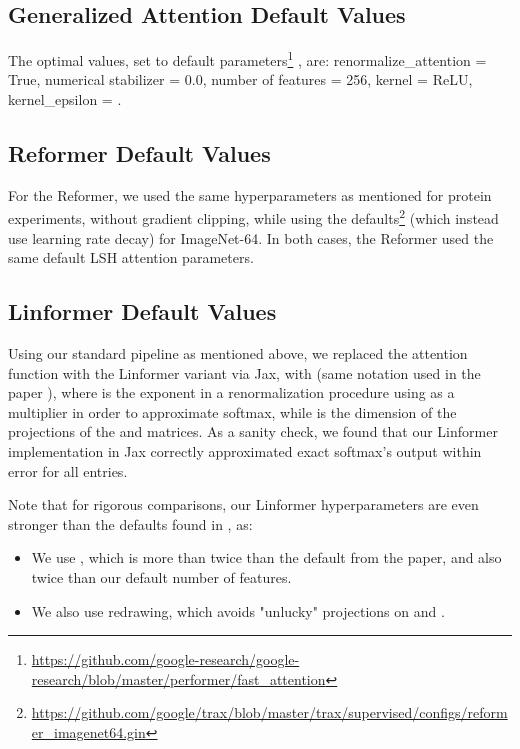 \subsection{Generalized Attention Default Values} \label{subsec:generalized_default} The optimal values, set to default parameters\footnote{\url{https://github.com/google-research/google-research/blob/master/performer/fast_attention}}
, are: renormalize\_attention = True, numerical stabilizer = 0.0, number of features = 256, kernel = ReLU, kernel\_epsilon = . 

\subsection{Reformer Default Values} \label{subsec:reformer_default}
For the Reformer, we used the same hyperparameters as mentioned for protein experiments, without gradient clipping, while using the defaults\footnote{\url{https://github.com/google/trax/blob/master/trax/supervised/configs/reformer_imagenet64.gin}} (which instead use learning rate decay) for ImageNet-64. In both cases, the Reformer used the same default LSH attention parameters.

\subsection{Linformer Default Values} \label{subsec:linformer_default}
Using our standard pipeline as mentioned above, we replaced the attention function with the Linformer variant via Jax, with  (same notation used in the paper \citep{linformer}), where  is the exponent in a renormalization procedure using  as a multiplier in order to approximate softmax, while  is the dimension of the projections of the  and  matrices. As a sanity check, we found that our Linformer implementation in Jax correctly approximated exact softmax's output within  error for all entries.

Note that for rigorous comparisons, our Linformer hyperparameters are even stronger than the defaults found in \citep{linformer}, as:

\begin{itemize}
\item We use , which is more than twice than the default  from the paper, and also twice than our default  number of features.
\item We also use redrawing, which avoids "unlucky" projections on  and . 
\end{itemize}


\newpage


